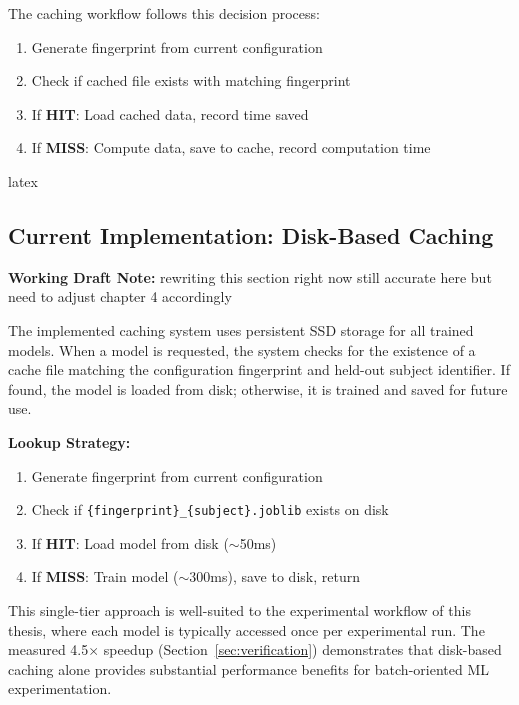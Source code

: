 \documentclass{imc-inf} %
\begin{document}
The caching workflow follows this decision process:

\begin{enumerate}
\item Generate fingerprint from current configuration
\item Check if cached file exists with matching fingerprint
\item If \textbf{HIT}: Load cached data, record time saved
\item If \textbf{MISS}: Compute data, save to cache, record computation time
\end{enumerate}

latex\subsection{Current Implementation: Disk-Based Caching}


\begin{center}
\colorbox{yellow!20}{%
\begin{minipage}{0.9\textwidth}
\textbf{Working Draft Note:} 
rewriting this section right now still accurate here but need to adjust chapter 4 accordingly
\end{minipage}
}
\end{center}

The implemented caching system uses persistent SSD storage for all trained models. 
When a model is requested, the system checks for the existence of a cache file 
matching the configuration fingerprint and held-out subject identifier. If found, 
the model is loaded from disk; otherwise, it is trained and saved for future use.

\textbf{Lookup Strategy:}
\begin{enumerate}
\item Generate fingerprint from current configuration
\item Check if \verb|{fingerprint}_{subject}.joblib| exists on disk
\item If \textbf{HIT}: Load model from disk ($\sim$50ms)
\item If \textbf{MISS}: Train model ($\sim$300ms), save to disk, return
\end{enumerate}

This single-tier approach is well-suited to the experimental workflow of this 
thesis, where each model is typically accessed once per experimental run. The 
measured 4.5$\times$ speedup (Section~\ref{sec:verification}) demonstrates that 
disk-based caching alone provides substantial performance benefits for 
batch-oriented ML experimentation.
\end{document}
